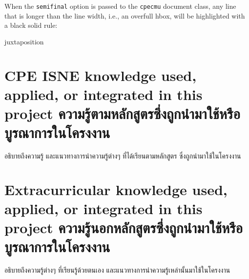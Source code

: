 When the \verb.semifinal. option is passed to the \verb.cpecmu. document class,
any line that is longer than the line width, i.e., an overfull hbox, will be
highlighted with a black solid rule:
\begin{center}
\begin{minipage}{10em}
juxtaposition
\end{minipage}
\end{center}

\section{\ifenglish%
\ifcpe CPE \else ISNE \fi knowledge used, applied, or integrated in this project
\else%
ความรู้ตามหลักสูตรซึ่งถูกนำมาใช้หรือบูรณาการในโครงงาน
\fi
}

อธิบายถึงความรู้ และแนวทางการนำความรู้ต่างๆ ที่ได้เรียนตามหลักสูตร ซึ่งถูกนำมาใช้ในโครงงาน

\section{\ifenglish%
Extracurricular knowledge used, applied, or integrated in this project
\else%
ความรู้นอกหลักสูตรซึ่งถูกนำมาใช้หรือบูรณาการในโครงงาน
\fi
}

อธิบายถึงความรู้ต่างๆ ที่เรียนรู้ด้วยตนเอง และแนวทางการนำความรู้เหล่านั้นมาใช้ในโครงงาน
